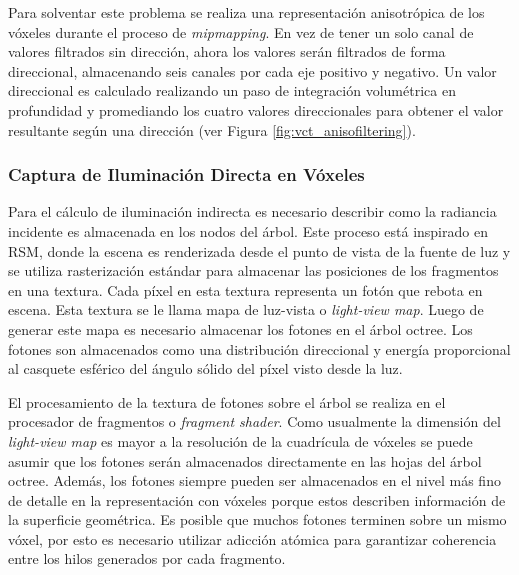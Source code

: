 Para solventar este problema se realiza una representación anisotrópica de los vóxeles durante el proceso de \emph{mipmapping}. En vez de tener un solo canal de valores filtrados sin dirección, ahora los valores serán filtrados de forma direccional, almacenando seis canales por cada eje positivo y negativo. Un valor direccional es calculado realizando un paso de integración volumétrica en profundidad y promediando los cuatro valores direccionales para obtener el valor resultante según una dirección (ver Figura \ref{fig:vct_anisofiltering}).

\subsubsection{Captura de Iluminación Directa en Vóxeles}
\label{subsub:voxel_capture}
Para el cálculo de iluminación indirecta es necesario describir como la radiancia incidente es almacenada en los nodos del árbol. Este proceso está inspirado en \ac{RSM}, donde la escena es renderizada desde el punto de vista de la fuente de luz y se utiliza rasterización estándar para almacenar las posiciones de los fragmentos en una textura. Cada píxel en esta textura representa un fotón que rebota en escena. Esta textura se le llama mapa de luz-vista o \emph{light-view map}. Luego de generar este mapa es necesario almacenar los fotones en el árbol octree. Los fotones son almacenados como una distribución direccional y energía proporcional al casquete esférico del ángulo sólido del píxel visto desde la luz.

El procesamiento de la textura de fotones sobre el árbol se realiza en el procesador de fragmentos o \emph{fragment shader}. Como usualmente la dimensión del \emph{light-view map} es mayor a la resolución de la cuadrícula de vóxeles se puede asumir que los fotones serán almacenados directamente en las hojas del árbol octree. Además, los fotones siempre pueden ser almacenados en el nivel más fino de detalle en la representación con vóxeles porque estos describen información de la superficie geométrica. Es posible que muchos fotones terminen sobre un mismo vóxel, por esto es necesario utilizar adicción atómica para garantizar coherencia entre los hilos generados por cada fragmento.
